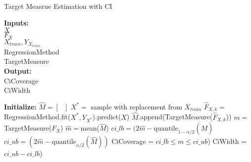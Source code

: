 \begin{algorithm}[!ht] \caption{Target Measrue Estimation with CI}
 \hspace*{\algorithmicindent} \textbf{Inputs:} \\
 \hspace*{\algorithmicindent} $X$  \\
 \hspace*{\algorithmicindent} $F_X$   \\
 \hspace*{\algorithmicindent} $X_{train}, Y_{X_{train}}$  \\
 \hspace*{\algorithmicindent} RegressionMethod  \\
 \hspace*{\algorithmicindent} TargetMeasure  \\
 \hspace*{\algorithmicindent} \textbf{Output:} \\
 \hspace*{\algorithmicindent} CiCoverage \\
 \hspace*{\algorithmicindent} CiWidth \\
\begin{algorithmic}[1]
    \State \textbf{Initialize:} $\hat{M} = \left[ \text{ } \right]$
     
        \State $X^{\ast} = $ sample with replacement from $X_{train}$
        \State $\hat{F}_{X,k} = $ RegressionMethod.fit($X^{\ast}, Y_{X^{\ast}}$).predict($X$)
        \State $\hat{M}$.append(TargetMeasure($\hat{F}_{X, k}$)) 
    \EndFor
    \State $m =$ TargetMeasure($F_X$) 
    \State $\hat{m} = $mean($\hat{M}$)
    \State $ci\_lb = (2\hat{m} - \text{quantile}_{1-\alpha/2}(\hat{M})$ 
    \State $ci\_ub = (2\hat{m} - \text{quantile}_{\alpha/2}(\hat{M}))$ 
    \State CiCoverage = $ ci\_lb \leq m \leq ci\_ub$)
    \State CiWidth = $ci\_ub - ci\_lb $)
\end{algorithmic}
\end{algorithm}\label{pc:target-measure-baseline}




